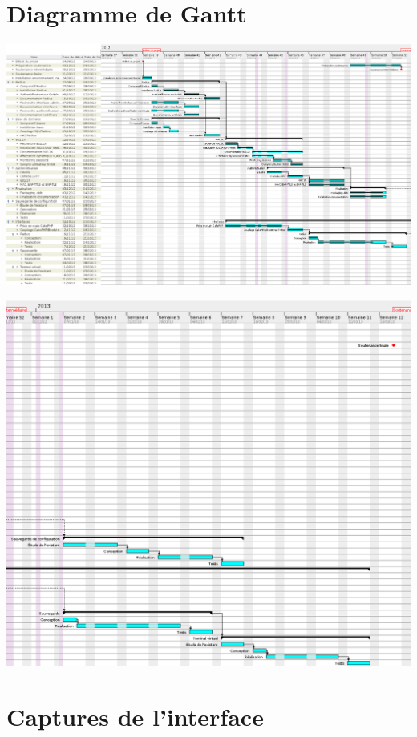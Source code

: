 \section{Diagramme de Gantt}
\label{gantt}
\begin{center}
	\includegraphics[width=\textwidth]{img/gantt1.png}

	\includegraphics[width=\textwidth]{img/gantt2.png}
\end{center}

\newpage
\section{Captures de l'interface}
\label{captures}

